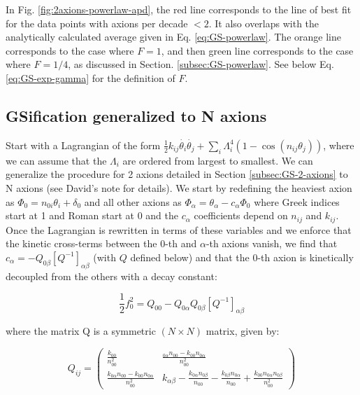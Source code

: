 \documentclass{article}
\begin{document}
In Fig. \ref{fig:2axions-powerlaw-apd}, the red line corresponds to the line of best fit for the data points with axions per decade $<2$. It also overlaps with the analytically calculated average given in Eq. \eqref{eq:GS-powerlaw}. The orange line corresponds to the case where $F=1$, and then green line corresponds to the case where $F=1/4$, as discussed in Section. \ref{subsec:GS-powerlaw}. See below Eq. \eqref{eq:GS-exp-gamma} for the definition of $F$. 

\subsection{GSification generalized to N axions}
\label{subsec:general-GS}

Start with a Lagrangian of the form $\frac{1}{2}k_{ij}\dot{\theta_i}\dot{\theta_j}+\sum_i\Lambda_i^4(1-\cos{(n_{ij}\theta_j)})$, where we can assume that the $\Lambda_i$ are ordered from largest to smallest. We can generalize the procedure for 2 axions  detailed in Section \ref{subsec:GS-2-axions} to N axions (see David's note for details). We start by redefining the heaviest axion as $\Phi_0 = n_{0i}\theta_i + \delta_0 $ and all other axions as $\Phi_\alpha = \theta_\alpha - c_\alpha\Phi_0 $ where Greek indices start at 1 and Roman start at 0 and the $c_\alpha$ coefficients depend on $n_{ij}$ and $k_{ij}$. Once the Lagrangian is rewritten in terms of these variables and we enforce that the kinetic cross-terms between the 0-th and $\alpha$-th axions vanish, we find that $c_\alpha = - Q_{0\beta}[Q^{-1}]_{\alpha\beta}$ (with $Q$ defined below) and that the 0-th axion is kinetically decoupled from the others with a decay constant:

\begin{equation}
    \label{eq:new-decay-constant}
    \frac{1}{2}f_0^2 = Q_{00} - Q_{0\alpha}Q_{0\beta}[Q^{-1}]_{\alpha\beta}
\end{equation}

\noindent where the matrix Q is a symmetric $(N\times N)$ matrix, given by:

\begin{equation}
    \label{eq:Q}
    Q_{ij} = \begin{pmatrix}
        \frac{k_{00}}{n_{00}^2} & \frac{_{0\alpha}n_{00}-k_{00}n_{0\alpha}}{n_{00}^2} \\
         \frac{k_{0\alpha}n_{00}-k_{00}n_{0\alpha}}{n_{00}^2} & k_{\alpha\beta} - \frac{k_{0\alpha}n_{0\beta}}{n_{00}} - \frac{k_{0\beta}n_{0\alpha}}{n_{00}} + \frac{k_{00} n_{0\alpha}n_{0\beta}}{n_{00}^2}
    \end{pmatrix}
\end{equation}
\end{document}
